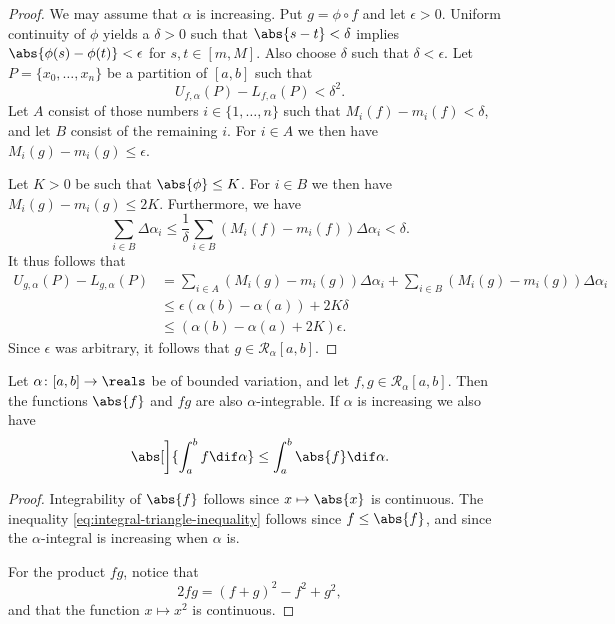 \documentclass[article, a4paper, 11pt, oneside]{memoir}
\numberwithin{equation}{chapter}
\newcommand{\calR}{\mathcal{R}}
\begin{document}
\begin{proof}
    We may assume that $\alpha$ is increasing. Put $g = \phi \circ f$ and let $\epsilon > 0$. Uniform continuity of $\phi$ yields a $\delta > 0$ such that $\abs{s-t} < \delta$ implies $\abs{\phi(s) - \phi(t)} < \epsilon$ for $s,t \in [m,M]$. Also choose $\delta$ such that $\delta < \epsilon$. Let $P = \{x_0, \ldots, x_n\}$ be a partition of $[a,b]$ such that
    \begin{equation*}
        U_{f,\alpha}(P) - L_{f,\alpha}(P) < \delta^2.
    \end{equation*}
    Let $A$ consist of those numbers $i \in \{1, \ldots, n\}$ such that $M_i(f) - m_i(f) < \delta$, and let $B$ consist of the remaining $i$. For $i \in A$ we then have $M_i(g) - m_i(g) \leq \epsilon$.

    Let $K > 0$ be such that $\abs{\phi} \leq K$. For $i \in B$ we then have $M_i(g) - m_i(g) \leq 2K$. Furthermore, we have
    \begin{equation*}
        \sum_{i \in B} \Delta\alpha_i
            \leq \frac{1}{\delta} \sum_{i \in B} (M_i(f) - m_i(f)) \Delta\alpha_i
            < \delta.
    \end{equation*}
    It thus follows that
    \begin{align*}
        U_{g, \alpha}(P) - L_{g, \alpha}(P)
            &= \sum_{i \in A} (M_i(g) - m_i(g)) \Delta\alpha_i
               + \sum_{i \in B} (M_i(g) - m_i(g)) \Delta\alpha_i \\
            &\leq \epsilon (\alpha(b) - \alpha(a))
               + 2K \delta \\
            &\leq (\alpha(b) - \alpha(a) + 2K) \epsilon.
    \end{align*}
    Since $\epsilon$ was arbitrary, it follows that $g \in \calR_\alpha[a,b]$.
\end{proof}


\begin{corollary}
    Let $\alpha \colon [a,b] \to \reals$ be of bounded variation, and let $f,g \in \calR_\alpha[a,b]$. Then the functions $\abs{f}$ and $fg$ are also $\alpha$-integrable. If $\alpha$ is increasing we also have
    \begin{equation}
        \label{eq:integral-triangle-inequality}
        \abs[\bigg]{ \int_a^b f \dif\alpha }
            \leq \int_a^b \abs{f}\dif\alpha.
    \end{equation}
\end{corollary}

\begin{proof}
    Integrability of $\abs{f}$ follows since $x \mapsto \abs{x}$ is continuous. The inequality \cref{eq:integral-triangle-inequality} follows since $f \leq \abs{f}$, and since the $\alpha$-integral is increasing when $\alpha$ is.

    For the product $fg$, notice that
    \begin{equation*}
        2fg = (f+g)^2 - f^2 + g^2,
    \end{equation*}
    and that the function $x \mapsto x^2$ is continuous.
\end{proof}
\end{document}
